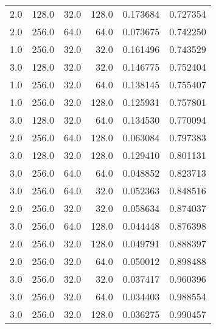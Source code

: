 \begin{longtable}{rrrrrr}
        2.0 &     128.0 &        32.0 &    128.0 &      0.173684 &    0.727354 \\
        2.0 &     256.0 &        64.0 &     64.0 &      0.073675 &    0.742250 \\
        1.0 &     256.0 &        32.0 &     32.0 &      0.161496 &    0.743529 \\
        3.0 &     128.0 &        32.0 &     32.0 &      0.146775 &    0.752404 \\
        1.0 &     256.0 &        32.0 &     64.0 &      0.138145 &    0.755407 \\
        1.0 &     256.0 &        32.0 &    128.0 &      0.125931 &    0.757801 \\
        3.0 &     128.0 &        32.0 &     64.0 &      0.134530 &    0.770094 \\
        2.0 &     256.0 &        64.0 &    128.0 &      0.063084 &    0.797383 \\
        3.0 &     128.0 &        32.0 &    128.0 &      0.129410 &    0.801131 \\
        3.0 &     256.0 &        64.0 &     64.0 &      0.048852 &    0.823713 \\
        3.0 &     256.0 &        64.0 &     32.0 &      0.052363 &    0.848516 \\
        2.0 &     256.0 &        32.0 &     32.0 &      0.058634 &    0.874037 \\
        3.0 &     256.0 &        64.0 &    128.0 &      0.044448 &    0.876398 \\
        2.0 &     256.0 &        32.0 &    128.0 &      0.049791 &    0.888397 \\
        2.0 &     256.0 &        32.0 &     64.0 &      0.050012 &    0.898488 \\
        3.0 &     256.0 &        32.0 &     32.0 &      0.037417 &    0.960396 \\
        3.0 &     256.0 &        32.0 &     64.0 &      0.034403 &    0.988554 \\
        3.0 &     256.0 &        32.0 &    128.0 &      0.036275 &    0.990457 \\
\end{longtable}
